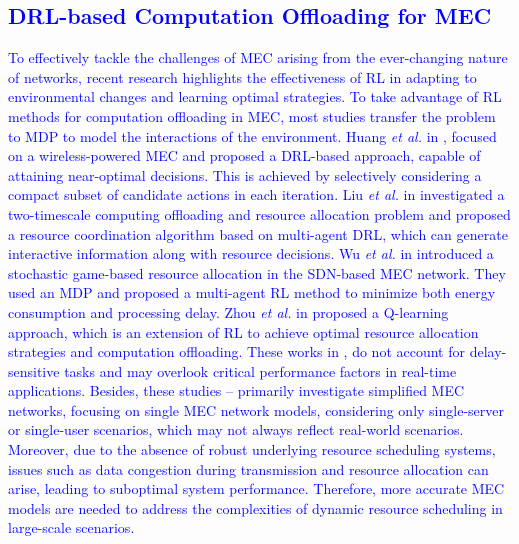 \documentclass[10pt, journal,letterpaper]{IEEEtran}
\begin{document}
 \textcolor{blue}{\subsection{DRL-based Computation Offloading for MEC}
To effectively tackle the challenges of MEC arising from the ever-changing nature of networks, recent research highlights the effectiveness of RL in adapting to environmental changes and learning optimal strategies. To take advantage of RL methods for computation offloading in MEC, most studies transfer the problem to MDP to model the interactions of the environment.
Huang \textit{et al.} in \cite{huang2019deep}, focused on a wireless-powered MEC and proposed a DRL-based approach, capable of attaining near-optimal decisions. This is achieved by selectively considering a compact subset of candidate actions in each iteration. Liu \textit{et al.} in \cite{liu2021learn} investigated a two-timescale computing offloading and resource allocation problem and proposed a resource coordination algorithm based on multi-agent DRL, which can generate interactive information along with resource decisions. 
Wu \textit{et al.} in \cite{wu2023computation} introduced a stochastic game-based resource allocation in the SDN-based MEC network. They used an MDP and proposed a multi-agent RL method to minimize both energy consumption and processing delay. 
Zhou \textit{et al.} in \cite{zhou2021deep} proposed a Q-learning approach, which is an extension of RL to achieve optimal resource allocation strategies and computation offloading. 
These works in \cite{huang2019deep}, \cite{liu2021learn} do not account for delay-sensitive tasks and may overlook critical performance factors in real-time applications. Besides, these studies \cite{huang2019deep}--\cite{zhou2021deep} primarily investigate simplified MEC networks, focusing on single MEC network models, considering only single-server or single-user scenarios, which may not always reflect real-world scenarios. 
Moreover, due to the absence of robust underlying resource scheduling systems, issues such as data congestion during transmission and resource allocation can arise, leading to suboptimal system performance. Therefore, more accurate MEC models are needed to address the complexities of dynamic resource scheduling in large-scale scenarios.}
\end{document}
